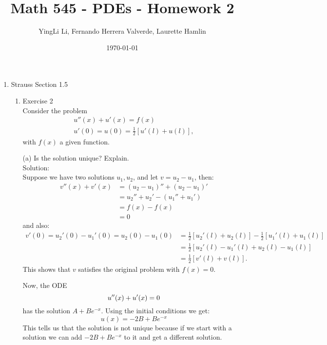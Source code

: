 \documentclass[12pt]{article}%
\begin{document}
\title{Math 545 - PDEs - Homework 2}
\author{YingLi Li, Fernando Herrera Valverde, Laurette Hamlin}
\date{\today}
\maketitle

\begin{enumerate}
    \item Strauss Section 1.5 \smallskip
    \begin{enumerate}
        \item Exercise 2 \smallskip \\
        Consider the problem
        \begin{gather*}
            u''(x) + u'(x) = f(x)\\
            u'(0)=u(0)=\frac{1}{2}[u'(l)+u(l)], 
        \end{gather*}
        with $f(x)$ a given function.

        (a) Is the solution unique? Explain.\\
     Solution: \\
        Suppose we have two solutions $u_1,u_2$, and let $v=u_2-u_1$, then:
        \begin{align*}
            v''(x) + v'(x) &=(u_2-u_1)'' + (u_2-u_1)' \\
                           &= u_2''+u_2' - (u_1''+u_1') \\
                           &= f(x) - f(x) \\
                           &=0
        \end{align*}
        and also:
        \begin{align*}
            v'(0) =u_2'(0)-u_1'(0) = u_2(0)
            -u_1(0)&=\frac{1}{2}[u_2'(l)+u_2(l)]-\frac{1}{2}[u_1'(l)+u_1(l)]\\
                  &=\frac{1}{2}[u_2'(l)-u_1'(l) + u_2(l)-u_1(l)]\\
                  &=\frac{1}{2}[v'(l) + v(l)].
        \end{align*}
        This shows that $v$ satisfies the original problem with $f(x)=0$.

        Now, the ODE
        \[
        u''(x) + u'(x) = 0\\
        \]
        has the solution $A+Be^{-x}$. Using the initial conditions we get:
        \[
        u(x)=-2B+Be^{-x}
        \]
        This tells us that the solution is not unique because if we start with
        a solution we can add $-2B + Be^{-x}$ to it and get a different solution.
    

\end{enumerate}
\end{enumerate}
\end{document}
